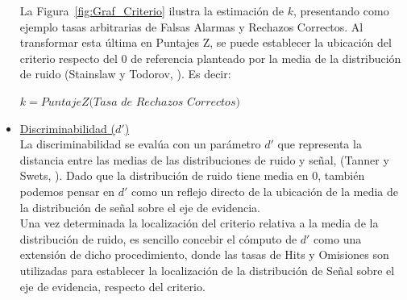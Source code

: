 \begin{itemize}
La Figura~\ref{fig:Graf_Criterio} ilustra la estimación de $k$, presentando como ejemplo tasas arbitrarias de Falsas Alarmas y Rechazos Correctos. Al transformar esta última en Puntajes Z, se puede establecer la ubicación del criterio respecto del 0 de referencia planteado por la media de la distribución de ruido (Stainslaw y Todorov, \citeyear{Stainslaw1999}). Es decir:\\

\begin{center}
$k = PuntajeZ(Tasa$ $de$ $Rechazos$ $Correctos)$\\
\end{center}

\item \underline{Discriminabilidad ($d'$)}\\

La discriminabilidad se evalúa con un parámetro $d'$ que representa la distancia entre las medias de las distribuciones de ruido y señal, (Tanner y Swets, \citeyear{Tanner1954}). Dado que la distribución de ruido tiene media en 0, también podemos pensar en $d'$ como un reflejo directo de la ubicación de la media de la distribución de señal sobre el eje de evidencia.\\ 

Una vez determinada la localización del criterio relativa a la media de la distribución de ruido, es sencillo concebir el cómputo de $d'$ como una extensión de dicho procedimiento, donde las tasas de Hits y Omisiones son utilizadas para establecer la localización de la distribución de Señal sobre el eje de evidencia, respecto del criterio.\\ 


\end{itemize}
